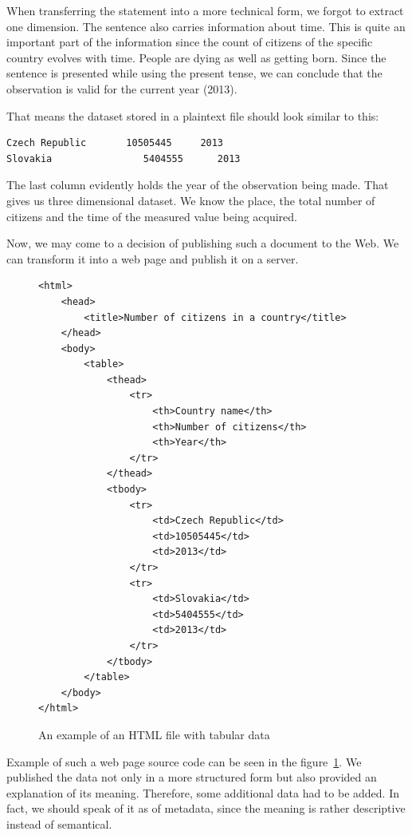 When transferring the statement into a more technical form, we forgot to extract one
dimension. The sentence also carries information about time. This is quite an important
part of the information since the count of citizens of the specific country evolves with time.
People are dying as well as getting born. Since the sentence is presented while using the
present tense, we can conclude that the observation is valid for the current year (2013).

That means the dataset stored in a plaintext file should look similar to this:

\begin{verbatim}
Czech Republic       10505445     2013
Slovakia	            5404555      2013
\end{verbatim}

The last column evidently holds the year of the observation being made.
That gives us three dimensional dataset. We know the place, the total number of
citizens and the time of the measured value being acquired.

Now, we may come to a decision of publishing such a document to the Web. We can transform
it into a web page and publish it on a server.
\begin{figure}
\small\begin{verbatim}
<html>
    <head>
        <title>Number of citizens in a country</title>
    </head>
    <body>
        <table>
            <thead>
                <tr>
                    <th>Country name</th>
                    <th>Number of citizens</th>
                    <th>Year</th>
                </tr>
            </thead>
            <tbody>
                <tr>
                    <td>Czech Republic</td>
                    <td>10505445</td>
                    <td>2013</td>
                </tr>
                <tr>
                    <td>Slovakia</td>
                    <td>5404555</td>
                    <td>2013</td>
                </tr>
            </tbody>
        </table>
    </body>
</html>
\end{verbatim}\normalsize
\caption{An example of an HTML file with tabular data}
\label{fig:rdf-html-01}
\end{figure}

Example of such a web page source code can be seen in the 
figure~\ref{fig:rdf-html-01}. We published the data not only in a more structured form but also
provided an explanation of its meaning. Therefore, some additional data had to be added. In fact, we
should speak of it as of metadata, since the meaning is rather descriptive instead of semantical.

